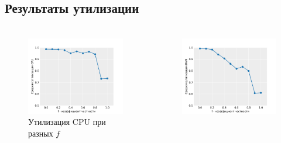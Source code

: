 \documentclass[t]{beamer}  %
\begin{document}
\subsection{Результаты утилизации}

\begin{frame}[fragile]
	\frametitle{\insertsection} 
	\framesubtitle{\insertsubsection}

	\vspace{-0.5cm}
	
	\begin{columns}
		\begin{column}{0.6\linewidth}
			\begin{figure}[H]
				\centering 
					\includegraphics[width=\linewidth]{images/cpu_utilization}
					\caption*{Утилизация CPU при разных $f$}
				\end{figure}
		\end{column}
		\hspace{-0.5cm}
		\begin{column}{0.6\linewidth}
			\begin{figure}[H]
				\centering 
					\includegraphics[width=\linewidth]{images/memory_utilization}

\end{figure}
\end{column}
\end{columns}
\end{frame}
\end{document}
